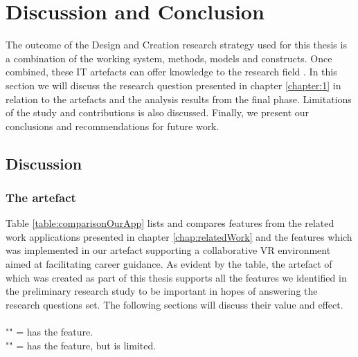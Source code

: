 
\chapter{Discussion and Conclusion}
The outcome of the Design and Creation research strategy used for this thesis is a combination of the working system, methods, models and constructs. Once combined, these IT artefacts can offer knowledge to the research field \cite{oates2005researching}. In this section we will discuss the research question presented in chapter \ref{chapter:1} in relation to the artefacts and the analysis results from the final phase. Limitations of the study and contributions is also discussed.
Finally, we present our conclusions and recommendations for future work.


\section{Discussion}

\subsection{The artefact} 
Table \ref{table:comparisonOurApp} lists and compares features from the related work applications presented in chapter \ref{chap:relatedWork} and the features which was implemented in our artefact supporting a collaborative VR environment aimed at facilitating career guidance. As evident by the table, the artefact of which was created as part of this thesis supports all the features we identified in the preliminary research study to be important in hopes of answering the research questions set. The following sections will discuss their value and effect.   
\\
\\ "\ON" = has the feature.
\\ "\LIM" = has the feature, but is limited.

